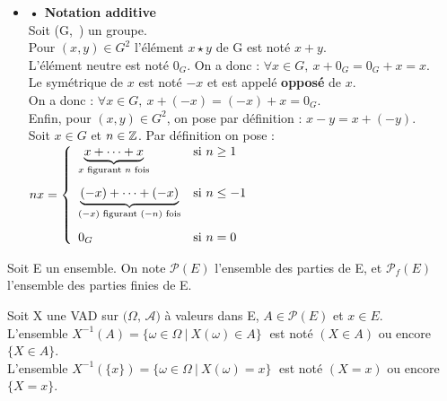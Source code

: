 \begin{itemize}[leftmargin=0cm]
    \item[] \hspace{0.5cm} \textbf{• Notation additive}\vspace{0.3cm}\\
    Soit (G,\ \lci) un groupe.\vspace{0.1cm}\\
    Pour \((x,y)\in G^2\) l'élément \(x\star y\) de G est noté \(x+y\).\\
    L'élément neutre est noté \(0_G\). On a donc : \(\forall x\in G,\ x+0_G=0_G+x=x\).\\
    Le symétrique de \(x\) est noté \(-x\) et est appelé \textbf{opposé} de \(x\).\\
    On a donc : \(\forall x\in G,\ x+(-x)=(-x)+x=0_G.\)\\
    Enfin, pour \((x,y)\in G^2\), on pose par définition : \(x-y=x+(-y).\)\vspace{0.4cm}\\
    Soit \(x\in G\) et \(n\in \mathbb{Z}\).
    Par définition on pose : \( nx= \left\{
    \begin{array}{ll}
        \underset{x \text{ figurant } n \text{ fois} }{\underbrace{x+ \cdots + x}} & \text{si } n\geq 1 \vspace{0.3cm} \\
        \underset{(-x) \text{ figurant } (-n) \text{ fois} }{\underbrace{(-x)+\cdots+(-x)}} & \text{si } n\leq -1\vspace{0.3cm} \\
        0_G & \text{si } n=0
    \end{array}
    \right. \)
\end{itemize}

\vspace{1.7cm}

Soit E un ensemble. On note \(\mathcal{P}(E)\) l'ensemble des parties de E, et \(\mathcal{P}_f(E)\) l'ensemble des parties finies de E.

\vspace{1cm}

Soit X une VAD sur \(\bigl(\Omega,\,\mathcal{A}\bigr)\) à valeurs dans E, \(A\in \mathcal{P}(E)\) et \(x\in E\).\vspace{0.1cm}\\
L'ensemble \(X^{-1}(A)=\{\omega\in \Omega \ \vert \ X(\omega)\in A\}\;\) est noté \((X\in A)\) ou encore \(\{X\in A\}\).\vspace{0.1cm}\\
L'ensemble \(X^{-1}(\{x\})=\{\omega\in \Omega \ \vert \ X(\omega)=x\}\;\) est noté \((X=x)\) ou encore \(\{X=x\}\).\vspace{0.1cm}\\

